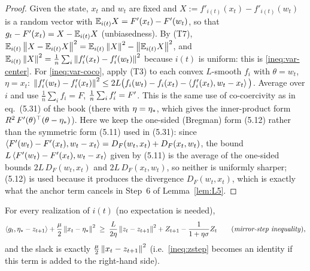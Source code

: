 \begin{proof}
Given the state, $x_t$ and $w_t$ are fixed and $X:=f'_{i(t)}(x_t)-f'_{i(t)}(w_t)$ is a random vector with $\mathbb{E}_{i(t)} X=F'(x_t)-F'(w_t)$, so that $g_t-F'(x_t)=X-\mathbb{E}_{i(t)} X$ (unbiasedness). By (T7), $\mathbb{E}_{i(t)}\left\|X-\mathbb{E}_{i(t)} X\right\|^2=\mathbb{E}_{i(t)}\left\|X\right\|^2-\left\|\mathbb{E}_{i(t)} X\right\|^2$, and $\mathbb{E}_{i(t)}\left\|X\right\|^2=\frac1n\sum_i\left\|f'_i(x_t)-f'_i(w_t)\right\|^2$ because $i(t)$ is uniform: this is \eqref{ineq:var-center}. For \eqref{ineq:var-coco}, apply (T3) to each convex $L$-smooth $f_i$ with $\theta=w_t$, $\eta=x_t$: $\left\|f'_i(w_t)-f'_i(x_t)\right\|^2\le 2L\big(f_i(w_t)-f_i(x_t)-\left\langle f'_i(x_t), w_t-x_t \right\rangle\big)$. Average over $i$ and use $\frac1n\sum_i f_i=F$, $\frac1n\sum_if'_i=F'$. This is the same use of co-coercivity as in eq.~(5.31) of the book (there with $\eta=\eta_\ast$, which gives the inner-product form $R^2\,F'(\theta)^\top(\theta-\eta_\ast)$). Here we keep the one-sided (Bregman) form (5.12) rather than the symmetric form (5.11) used in (5.31): since $\left\langle F'(w_t)-F'(x_t), w_t-x_t \right\rangle=D_F(w_t,x_t)+D_F(x_t,w_t)$, the bound $L\left\langle F'(w_t)-F'(x_t), w_t-x_t \right\rangle$ given by (5.11) is the average of the one-sided bounds $2L\,D_F(w_t,x_t)$ and $2L\,D_F(x_t,w_t)$, so neither is uniformly sharper; (5.12) is used because it produces the divergence $D_F(w_t,x_t)$, which is exactly what the anchor term cancels in Step~6 of Lemma~\ref{lem:L5}.
\end{proof}

\begin{lemma}\label{lem:L2}
For every realization of $i(t)$ (no expectation is needed),
\begin{equation}\label{ineq:zstep}
\left\langle g_t, \eta_\ast-z_{t+1} \right\rangle+\frac\mu2\left\|x_t-\eta_\ast\right\|^2\;\ge\;\frac L{2\eta}\left\|z_t-z_{t+1}\right\|^2+Z_{t+1}-\frac1{1+\eta\sigma}Z_t
\qquad\text{(\emph{mirror-step inequality}),}
\end{equation}
and the slack is exactly $\frac\mu2\left\|x_t-z_{t+1}\right\|^2$ (i.e.\ \eqref{ineq:zstep} becomes an identity if this term is added to the right-hand side).
\end{lemma}

